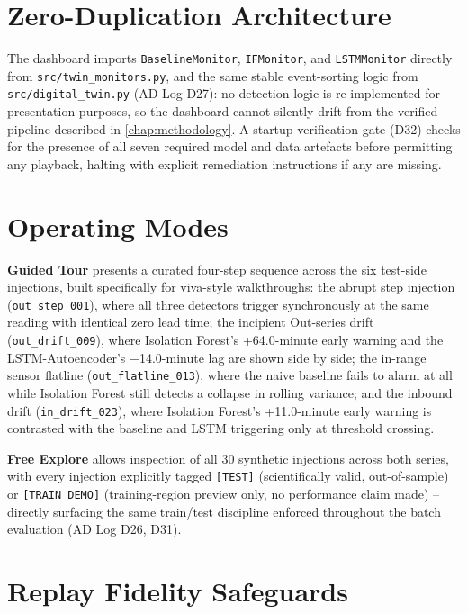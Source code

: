 \documentclass[11pt,a4paper,oneside]{report}
\begin{document}
\section{Zero-Duplication Architecture}
\label{sec:dash_architecture}

{\raggedright The dashboard imports \texttt{BaselineMonitor}, \texttt{IFMonitor}, and \texttt{LSTMMonitor} directly from \texttt{src/twin\_monitors.py}, and the same stable event-sorting logic from \texttt{src/digital\_twin.py} (AD Log D27): no detection logic is re-implemented for presentation purposes, so the dashboard cannot silently drift from the verified pipeline described in \cref{chap:methodology}. A startup verification gate (D32) checks for the presence of all seven required model and data artefacts before permitting any playback, halting with explicit remediation instructions if any are missing.
\par}

\section{Operating Modes}
\label{sec:dash_modes}

\textbf{Guided Tour} presents a curated four-step sequence across the six test-side injections, built specifically for viva-style walkthroughs: the abrupt step injection (\texttt{out\_step\_001}), where all three detectors trigger synchronously at the same reading with identical zero lead time; the incipient Out-series drift (\texttt{out\_drift\_009}), where Isolation Forest's +64.0-minute early warning and the LSTM-Autoencoder's $-$14.0-minute lag are shown side by side; the in-range sensor flatline (\texttt{out\_flatline\_013}), where the naive baseline fails to alarm at all while Isolation Forest still detects a collapse in rolling variance; and the inbound drift (\texttt{in\_drift\_023}), where Isolation Forest's +11.0-minute early warning is contrasted with the baseline and LSTM triggering only at threshold crossing.

\textbf{Free Explore} allows inspection of all 30 synthetic injections across both series, with every injection explicitly tagged \texttt{[TEST]} (scientifically valid, out-of-sample) or \texttt{[TRAIN\allowbreak\ DEMO]} (training-region preview only, no performance claim made) -- directly surfacing the same train/test discipline enforced throughout the batch evaluation (AD Log D26, D31).

\section{Replay Fidelity Safeguards}
\label{sec:dash_fidelity}
\end{document}
